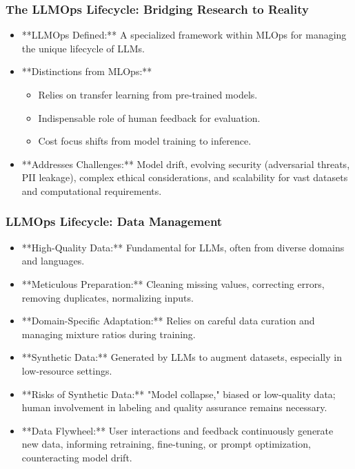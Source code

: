 \documentclass{beamer}       %
\begin{document}
\begin{frame}
    \frametitle{The LLMOps Lifecycle: Bridging Research to Reality}
    \begin{itemize}
        \item **LLMOps Defined:** A specialized framework within MLOps for managing the unique lifecycle of LLMs.
        \item **Distinctions from MLOps:**
        \begin{itemize}
            \item Relies on transfer learning from pre-trained models.
            \item Indispensable role of human feedback for evaluation.
            \item Cost focus shifts from model training to inference.
        \end{itemize}
        \item **Addresses Challenges:** Model drift, evolving security (adversarial threats, PII leakage), complex ethical considerations, and scalability for vast datasets and computational requirements.
    \end{itemize}
\end{frame}

\begin{frame}
    \frametitle{LLMOps Lifecycle: Data Management}
    \begin{itemize}
        \item **High-Quality Data:** Fundamental for LLMs, often from diverse domains and languages.
        \item **Meticulous Preparation:** Cleaning missing values, correcting errors, removing duplicates, normalizing inputs.
        \item **Domain-Specific Adaptation:** Relies on careful data curation and managing mixture ratios during training.
        \item **Synthetic Data:** Generated by LLMs to augment datasets, especially in low-resource settings.
        \item **Risks of Synthetic Data:** "Model collapse," biased or low-quality data; human involvement in labeling and quality assurance remains necessary.
        \item **Data Flywheel:** User interactions and feedback continuously generate new data, informing retraining, fine-tuning, or prompt optimization, counteracting model drift.
    \end{itemize}
\end{frame}
\end{document}
